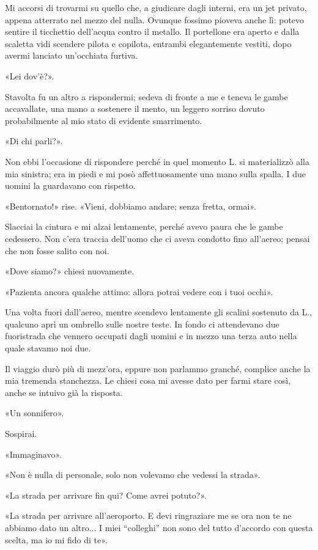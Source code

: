 \documentclass[a4paper,12pt]{book}
\begin{document}
Mi accorsi di trovarmi su quello che, a giudicare dagli interni, era un jet
privato, appena atterrato nel mezzo del nulla. Ovunque fossimo pioveva anche lì:
potevo sentire il ticchettio dell'acqua contro il metallo. Il portellone era
aperto e dalla scaletta vidi scendere pilota e copilota, entrambi elegantemente
vestiti, dopo avermi lanciato un'occhiata furtiva.

«Lei dov'è?».

Stavolta fu un altro a rispondermi; sedeva di fronte a me e teneva le gambe
accavallate, una mano a sostenere il mento, un leggero sorriso dovuto
probabilmente al mio stato di evidente smarrimento.

«Di chi parli?».

Non ebbi l'occasione di rispondere perché in quel momento L. si materializzò
alla mia sinistra; era in piedi e mi posò affettuosamente una mano sulla spalla.
I due uomini la guardavano con rispetto.

«Bentornato!» rise. «Vieni, dobbiamo andare; senza fretta, ormai».

Slacciai la cintura e mi alzai lentamente, perché avevo paura che le gambe
cedessero. Non c'era traccia dell'uomo che ci aveva condotto fino all'aereo;
pensai che non fosse salito con noi.

«Dove siamo?» chiesi nuovamente.

«Pazienta ancora qualche attimo: allora potrai vedere con i tuoi occhi».

Una volta fuori dall'aereo, mentre scendevo lentamente gli scalini sostenuto
da L., qualcuno aprì un ombrello sulle nostre teste. In fondo ci attendevano due
fuoristrada che vennero occupati dagli uomini e in mezzo una terza auto nella
quale stavamo noi due.

Il viaggio durò più di mezz'ora, eppure non parlammo granché, complice anche la
mia tremenda stanchezza. Le chiesi cosa mi avesse dato per farmi stare così,
anche se intuivo già la risposta.

«Un sonnifero».

Sospirai.

«Immaginavo».

«Non è nulla di personale, solo non volevamo che vedessi la strada».

«La strada per arrivare fin qui? Come avrei potuto?».

«La strada per arrivare all'aeroporto. E devi ringraziare me se ora non te ne
abbiamo dato un altro... I miei ``colleghi'' non sono del tutto d'accordo con
questa scelta, ma io mi fido di te».
\end{document}
